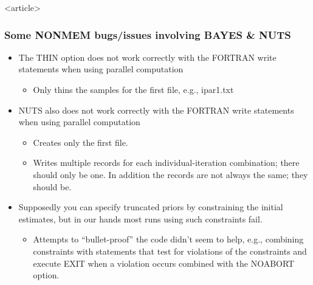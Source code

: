 \documentclass{beamer}
\begin{document}
  


  \begin{frame}<article>
    \frametitle{Some NONMEM bugs/issues involving BAYES \& NUTS}

    \begin{itemize}
    \item The THIN option does not work correctly with the FORTRAN
      write statements when using parallel computation
      \begin{itemize}
      \item Only thins the samples for the first file, e.g., ipar1.txt
      \end{itemize}
    \item NUTS also does not work correctly with the FORTRAN write
      statements when using parallel computation
      \begin{itemize}
      \item Creates only the first file.
      \item Writes multiple records for each individual-iteration
        combination; there should only be one. In addition the records
        are not always the same; they should be.
      \end{itemize}
    \item Supposedly you can specify truncated priors by constraining
      the initial estimates, but in our hands most runs using such
      constraints fail.
      \begin{itemize}
        \item Attempts to ``bullet-proof'' the code didn't seem to help,
        e.g., combining constraints with statements that test for
        violations of the constraints and execute EXIT when a
        violation occurs combined with the NOABORT option.
      \end{itemize}
    \end{itemize}
    
  \end{frame}
\end{document}
